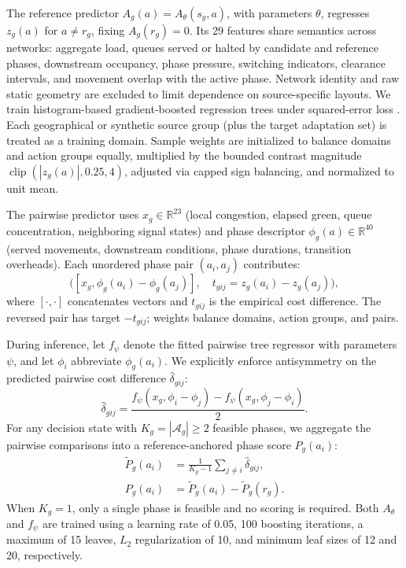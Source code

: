 \documentclass[letterpaper,journal]{IEEEtran}
\newcommand{\R}{\mathbb{R}}
\begin{document}
The reference predictor $A_g(a)=A_\theta(s_g,a)$, with parameters $\theta$, regresses $z_g(a)$ for $a\ne r_g$, fixing $A_g(r_g)=0$. Its 29 features share semantics across networks: aggregate load, queues served or halted by candidate and reference phases, downstream occupancy, phase pressure, switching indicators, clearance intervals, and movement overlap with the active phase. Network identity and raw static geometry are excluded to limit dependence on source-specific layouts. We train histogram-based gradient-boosted regression trees under squared-error loss \cite{friedman2001greedy,pedregosa2011scikit}. Each geographical or synthetic source group (plus the target adaptation set) is treated as a training domain. Sample weights are initialized to balance domains and action groups equally, multiplied by the bounded contrast magnitude $\operatorname{clip}(|z_g(a)|,0.25,4)$, adjusted via capped sign balancing, and normalized to unit mean.

The pairwise predictor uses $x_g\in\R^{23}$ (local congestion, elapsed green, queue concentration, neighboring signal states) and phase descriptor $\phi_g(a)\in\R^{40}$ (served movements, downstream conditions, phase durations, transition overheads). Each unordered phase pair $(a_i,a_j)$ contributes:
\begin{equation}
 \bigl([x_g,\phi_g(a_i)-\phi_g(a_j)],\quad
 t_{gij}=z_g(a_i)-z_g(a_j)\bigr),
 \label{eq:pairdata}
\end{equation}
where $[\cdot,\cdot]$ concatenates vectors and $t_{gij}$ is the empirical cost difference. The reversed pair has target $-t_{gij}$; weights balance domains, action groups, and pairs.

During inference, let $f_\psi$ denote the fitted pairwise tree regressor with parameters $\psi$, and let $\phi_i$ abbreviate $\phi_g(a_i)$. We explicitly enforce antisymmetry on the predicted pairwise cost difference $\widehat\delta_{gij}$:
\begin{equation}
 \widehat\delta_{gij}=\frac{f_\psi(x_g,\phi_i-\phi_j)
 -f_\psi(x_g,\phi_j-\phi_i)}{2}.
 \label{eq:antisym}
\end{equation}
For any decision state with $K_g=|\mathcal A_g|\geq2$ feasible phases, we aggregate the pairwise comparisons into a reference-anchored phase score $P_g(a_i)$:
\begin{align}
 \widetilde P_g(a_i)&=\frac{1}{K_g-1}\sum_{j\ne i}\widehat\delta_{gij},\nonumber\\
 P_g(a_i)&=\widetilde P_g(a_i)-\widetilde P_g(r_g).
 \label{eq:pairscore}
\end{align}
When $K_g=1$, only a single phase is feasible and no scoring is required. Both $A_\theta$ and $f_\psi$ are trained using a learning rate of 0.05, 100 boosting iterations, a maximum of 15 leaves, $L_2$ regularization of 10, and minimum leaf sizes of 12 and 20, respectively.
\end{document}
